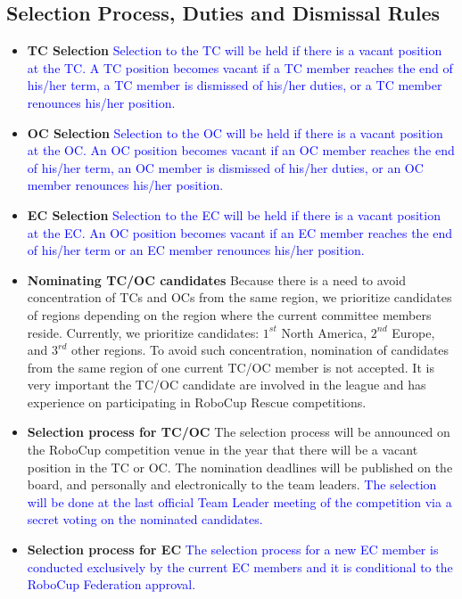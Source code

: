 \documentclass{article}
\begin{document}
\subsection{Selection Process, Duties and Dismissal Rules}
\begin{itemize}
  \item \textbf{TC Selection} \textcolor{blue}{Selection to the TC will be held if there is a vacant position at the TC. A TC position becomes vacant if a TC member reaches the end of his/her term, a TC member is dismissed of his/her duties, or a TC member renounces his/her position.}
  \item \textbf{OC Selection} \textcolor{blue}{Selection to the OC will be held if there is a vacant position at the OC. An OC position becomes vacant if an OC member reaches the end of his/her term, an OC member is dismissed of his/her duties, or an OC member renounces his/her position.}
  \item \textbf{EC Selection} \textcolor{blue}{Selection to the EC will be held if there is a vacant position at the EC. An OC position becomes vacant if an EC member reaches the end of his/her term or an EC member renounces his/her position.}
  \item \textbf{Nominating TC/OC candidates} Because there is a need to avoid concentration of TCs and OCs from the same region, we prioritize candidates of regions depending on the region where the current committee members reside. Currently, we prioritize candidates: $1^{st}$ North America, $2^{nd}$ Europe, and $3^{rd}$ other regions. To avoid such concentration, nomination of candidates from the same region of one current TC/OC member is not accepted. It is very important the TC/OC candidate are involved in the league and has experience on participating in RoboCup Rescue competitions.
  \item \textbf{Selection process for TC/OC} The selection process will be announced on the RoboCup competition venue in the year that there will be a vacant position in the TC or OC. The nomination deadlines will be published on the board, and personally and electronically to the team leaders. \textcolor{blue}{The selection will be done at the last official Team Leader meeting of the competition via a secret voting on the nominated candidates.}
  \item \textbf{Selection process for EC} \textcolor{blue}{The selection process for a new EC member is conducted exclusively by the current EC members and it is conditional to the RoboCup Federation approval.}

\end{itemize}
\end{document}
